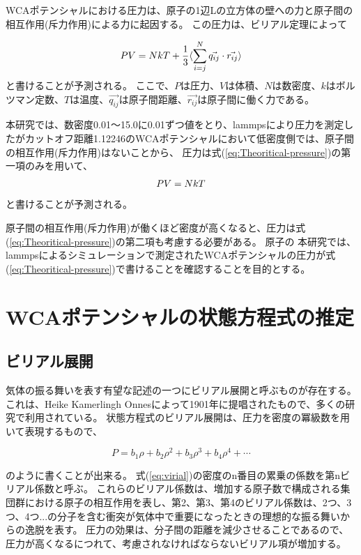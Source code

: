 \documentclass[titlepage]{jsreport}
\begin{document}
WCAポテンシャルにおける圧力は、原子の1辺Lの立方体の壁への力と原子間の相互作用(斥力作用)による力に起因する。
この圧力は、ビリアル定理\cite{virial-therom}によって

\large
\begin{equation}
PV=NkT+{\frac{1}{3}}\langle\sum_{i=j}^N\vec{q_{ij}} \cdot \vec{r_{ij}}\rangle{\label{eq:Theoritical-pressure}}
\end{equation}
\normalsize
と書ける\cite{Theoritical-pressure}ことが予測される。
ここで、$P$は圧力、$V$は体積、$N$は数密度、$k$はボルツマン定数、$T$は温度、$\vec{q_{ij}}$は原子間距離、$\vec{r_{ij}}$は原子間に働く力である。

本研究では、数密度0.01〜15.0に0.01ずつ値をとり、lammpsにより圧力を測定したがカットオフ距離1.12246のWCAポテンシャルにおいて低密度側では、原子間の相互作用(斥力作用)はないことから、
圧力は式(\ref{eq:Theoritical-pressure})の第一項のみを用いて、
\large
\begin{equation}
PV=NkT{\label{eq:ideal-gas}}
\end{equation}
\normalsize
と書けることが予測される。

原子間の相互作用(斥力作用)が働くほど密度が高くなると、圧力は式(\ref{eq:Theoritical-pressure})の第二項も考慮する必要がある。
原子の
本研究では、lammpsによるシミュレーションで測定されたWCAポテンシャルの圧力が式(\ref{eq:Theoritical-pressure})で書けることを確認することを目的とする。



\section{WCAポテンシャルの状態方程式の推定}\label{method-sec:WCA-equation}
\subsection{ビリアル展開}\label{method-subsec:virial}
気体の振る舞いを表す有望な記述の一つにビリアル展開と呼ぶものが存在する。
これは、Heike Kamerlingh Onnesによって1901年に提唱されたもの\cite{virial-Heike}で、多くの研究で利用されている。
状態方程式のビリアル展開は、圧力を密度の冪級数を用いて表現するもので、

\large
\begin{equation}
P=b_1{\rho}+b_2{\rho}^2+b_3{\rho}^3+b_4{\rho}^4+\cdots \label{eq:virial}
\end{equation}

\normalsize
のように書くことが出来る。
式(\ref{eq:virial})の密度のn番目の累乗の係数を第nビリアル係数と呼ぶ\cite{virial-expansion}。
これらのビリアル係数は、増加する原子数で構成される集団群における原子の相互作用を表し、第2、第3、第4のビリアル係数は、2つ、3つ、4つ...の分子を含む衝突が気体中で重要になったときの理想的な振る舞いからの逸脱を表す。
圧力の効果は、分子間の距離を減少させることであるので、圧力が高くなるにつれて、考慮されなければならないビリアル項が増加する\cite{virial-Heike}。
\end{document}
